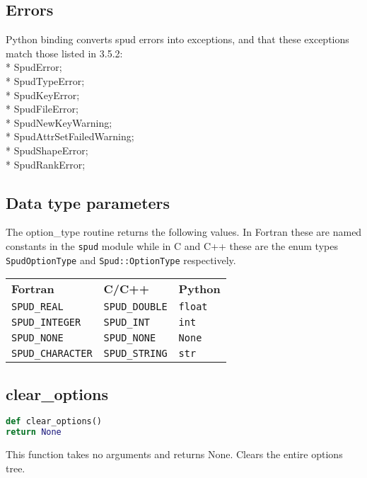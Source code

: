 \documentclass[a4paper, 11pt]{book}
\begin{document}
\subsection{Errors}

Python binding converts spud errors into exceptions, and that these exceptions match those listed in 3.5.2:  \\*
SpudError; \\*
SpudTypeError; \\*
SpudKeyError; \\*
SpudFileError; \\*
SpudNewKeyWarning; \\*
SpudAttrSetFailedWarning; \\*
SpudShapeError; \\*
SpudRankError;

\subsection{Data type parameters}\label{sec:types}

The option\_type routine returns the following values. In Fortran these are
named constants in the \lstinline+spud+ module while in C and C++ these are
the enum types \lstinline+SpudOptionType+ and \lstinline+Spud::OptionType+
respectively.

\begin{tabular}{lll}
  \textbf{Fortran} & \textbf{C/C++} & \textbf{Python} \\
  \lstinline+SPUD_REAL+ & \lstinline+SPUD_DOUBLE+ & \lstinline+float+ \\
  \lstinline+SPUD_INTEGER+ & \lstinline+SPUD_INT+ & \lstinline+int+ \\
  \lstinline+SPUD_NONE+ & \lstinline+SPUD_NONE+ & \lstinline+None+ \\
  \lstinline+SPUD_CHARACTER+ & \lstinline+SPUD_STRING+ & \lstinline+str+
\end{tabular}

\subsection{clear\_options}

\begin{lstlisting}[language=Python]
def clear_options()
return None
\end{lstlisting}

This function takes no arguments and returns None.
Clears the entire options tree.
\end{document}
